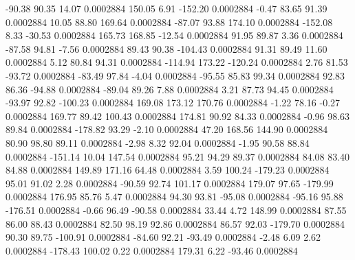       -90.38       90.35       14.07     0.0002884
      150.05        6.91     -152.20     0.0002884
       -0.47       83.65       91.39     0.0002884
       10.05       88.80      169.64     0.0002884
      -87.07       93.88      174.10     0.0002884
     -152.08        8.33      -30.53     0.0002884
      165.73      168.85      -12.54     0.0002884
       91.95       89.87        3.36     0.0002884
      -87.58       94.81       -7.56     0.0002884
       89.43       90.38     -104.43     0.0002884
       91.31       89.49       11.60     0.0002884
        5.12       80.84       94.31     0.0002884
     -114.94      173.22     -120.24     0.0002884
        2.76       81.53      -93.72     0.0002884
      -83.49       97.84       -4.04     0.0002884
      -95.55       85.83       99.34     0.0002884
       92.83       86.36      -94.88     0.0002884
      -89.04       89.26        7.88     0.0002884
        3.21       87.73       94.45     0.0002884
      -93.97       92.82     -100.23     0.0002884
      169.08      173.12      170.76     0.0002884
       -1.22       78.16       -0.27     0.0002884
      169.77       89.42      100.43     0.0002884
      174.81       90.92       84.33     0.0002884
       -0.96       98.63       89.84     0.0002884
     -178.82       93.29       -2.10     0.0002884
       47.20      168.56      144.90     0.0002884
       80.90       98.80       89.11     0.0002884
       -2.98        8.32       92.04     0.0002884
       -1.95       90.58       88.84     0.0002884
     -151.14       10.04      147.54     0.0002884
       95.21       94.29       89.37     0.0002884
       84.08       83.40       84.88     0.0002884
      149.89      171.16       64.48     0.0002884
        3.59      100.24     -179.23     0.0002884
       95.01       91.02        2.28     0.0002884
      -90.59       92.74      101.17     0.0002884
      179.07       97.65     -179.99     0.0002884
      176.95       85.76        5.47     0.0002884
       94.30       93.81      -95.08     0.0002884
      -95.16       95.88     -176.51     0.0002884
       -0.66       96.49      -90.58     0.0002884
       33.44        4.72      148.99     0.0002884
       87.55       86.00       88.43     0.0002884
       82.50       98.19       92.86     0.0002884
       86.57       92.03     -179.70     0.0002884
       90.30       89.75     -100.91     0.0002884
      -84.60       92.21      -93.49     0.0002884
       -2.48        6.09        2.62     0.0002884
     -178.43      100.02        0.22     0.0002884
      179.31        6.22      -93.46     0.0002884
